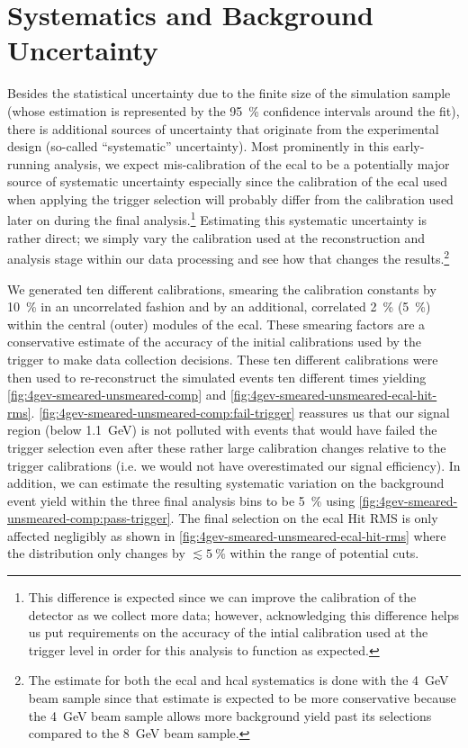 \section{Systematics and Background Uncertainty}
\label{sec:ldmx:analysis:systematics}
Besides the statistical uncertainty due to the finite size of the simulation sample
(whose estimation is represented by the \qty{95}{\percent} confidence intervals around the fit),
there is additional sources of uncertainty that originate from the experimental design
(so-called ``systematic'' uncertainty).
Most prominently in this early-running analysis, we expect mis-calibration of the \ac{ecal}
to be a potentially major source of systematic uncertainty especially since the calibration
of the \ac{ecal} used when applying the trigger selection will probably differ from the
calibration used later on during the final analysis.\footnote{
  This difference is expected since we can improve the calibration of the detector as we
  collect more data; however, acknowledging this difference helps us put requirements on
  the accuracy of the intial calibration used at the trigger level in order for this
  analysis to function as expected.
}
Estimating this systematic uncertainty is rather direct; we simply vary the calibration
used at the reconstruction and analysis stage within our data processing and see how that
changes the results.\footnote{
  The estimate for both the \ac{ecal} and \ac{hcal} systematics is done with the
  \qty{4}{\GeV} beam sample since that estimate is expected to be more conservative
  because the \qty{4}{\GeV} beam sample allows more background yield past its selections
  compared to the \qty{8}{\GeV} beam sample.
}

We generated ten different calibrations, smearing the calibration constants by \qty{10}{\percent}
in an uncorrelated fashion and by an additional, correlated \qty{2}{\percent} (\qty{5}{\percent})
within the central (outer) modules of the \ac{ecal}.
These smearing factors are a conservative estimate of the accuracy of the initial calibrations
used by the trigger to make data collection decisions.
These ten different calibrations were then used to re-reconstruct the simulated events
ten different times yielding \cref{fig:4gev-smeared-unsmeared-comp}
and \cref{fig:4gev-smeared-unsmeared-ecal-hit-rms}.
\cref{fig:4gev-smeared-unsmeared-comp:fail-trigger} reassures us that our signal region
(below \qty{1.1}{\GeV}) is not polluted with events that would have failed the trigger
selection even after these rather large calibration changes relative to the trigger calibrations
(i.e. we would not have overestimated our signal efficiency).
In addition, we can estimate the resulting systematic variation on the background
event yield within the three final analysis bins to be \qty{5}{\percent} using
\cref{fig:4gev-smeared-unsmeared-comp:pass-trigger}.
The final selection on the \ac{ecal} Hit RMS is only affected negligibly as shown in
\cref{fig:4gev-smeared-unsmeared-ecal-hit-rms} where the distribution only changes by
$\lesssim\qty{5}{\percent}$ within the range of potential cuts.

